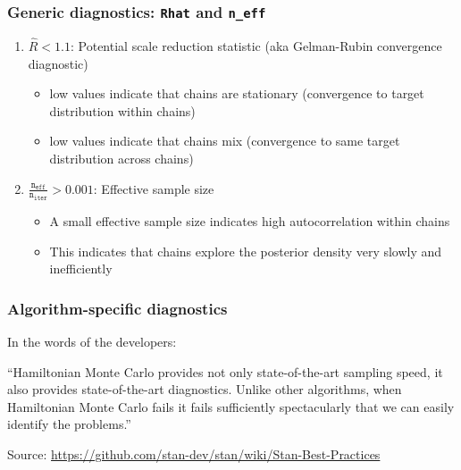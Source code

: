 \documentclass[
  11pt,
]{article}
\providecommand{\tightlist}{%
  \setlength{\itemsep}{0pt}\setlength{\parskip}{0pt}}
\begin{document}
\hypertarget{generic-diagnostics-rhat-and-n_eff}{%
\subsubsection{\texorpdfstring{Generic diagnostics: \texttt{Rhat} and \texttt{n\_eff}}{Generic diagnostics: Rhat and n\_eff}}\label{generic-diagnostics-rhat-and-n_eff}}

\begin{enumerate}
\def\labelenumi{\arabic{enumi}.}
\tightlist
\item
  \(\hat{R} < 1.1\): Potential scale reduction statistic (aka Gelman-Rubin convergence diagnostic)

  \begin{itemize}
  \tightlist
  \item
    low values indicate that chains are stationary (convergence to target distribution within chains)
  \item
    low values indicate that chains mix (convergence to same target distribution across chains)
  \end{itemize}
\item
  \(\frac{\mathtt{n_{eff}}}{\mathtt{n_{iter}}} > 0.001\): Effective sample size

  \begin{itemize}
  \tightlist
  \item
    A small effective sample size indicates high autocorrelation within chains
  \item
    This indicates that chains explore the posterior density very slowly and inefficiently
  \end{itemize}
\end{enumerate}

\hypertarget{algorithm-specific-diagnostics}{%
\subsubsection{Algorithm-specific diagnostics}\label{algorithm-specific-diagnostics}}

In the words of the developers:

``Hamiltonian Monte Carlo provides not only state-of-the-art sampling speed, it also provides state-of-the-art diagnostics. Unlike other algorithms, when Hamiltonian Monte Carlo fails it fails sufficiently spectacularly that we can easily identify the problems.''

Source: \url{https://github.com/stan-dev/stan/wiki/Stan-Best-Practices}
\end{document}

